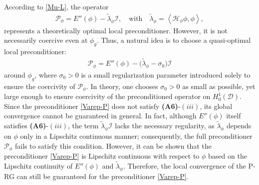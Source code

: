 \documentclass[preprint,3p]{elsarticle}
\begin{document}
According to \eqref{Mu-L}, the operator 
\begin{align*}
	\mathcal{P}_{\phi} = E''(\phi) - \widetilde{\lambda}_{\phi}\mathcal{I},\quad\text{with}\quad \widetilde{\lambda}_{\phi}=\left\langle\mathcal{H}_{\phi}\phi,\phi\right\rangle,
\end{align*}
represents a theoretically optimal local preconditioner. However, it is not necessarily coercive even at $\phi_g$. Thus, a natural idea is to choose a {quasi}-optimal local preconditioner:
\begin{align}\label{Varep-P}
	\mathcal{P}_{\phi}=E''(\phi)-\big(\widetilde{\lambda}_{\phi}-\sigma_0\big)\mathcal{I}
\end{align}
around $\phi_g$, where {$\sigma_0>0$ is a small regularization parameter introduced solely to ensure the coercivity of $\mathcal{P}_{\phi}$. In theory, one chooses $\sigma_0>0$ as small as possible, yet large enough to ensure coercivity of the preconditioned operator on $H_0^1(\mathcal{D})$.} 
Since the preconditioner \eqref{Varep-P} does not satisfy {\bf (A6)}-$(iii)$, its global convergence cannot be guaranteed in general. {In fact, although $E''(\phi)$ itself satisfies {\bf (A6)}-$(iii)$, the term $\widetilde{\lambda}_{\phi} \mathcal{I}$ lacks the necessary regularity, as $\widetilde{\lambda}_{\phi}$ depends on $\phi$ only in a Lipschitz continuous manner; consequently, the full preconditioner $\mathcal{P}_{\phi}$ fails to satisfy this condition.} However, it can be shown that the preconditioner \eqref{Varep-P} is Lipschitz continuous with respect to $\phi$ based on the Lipschitz continuity of $E''(\phi)$ and $\widetilde{\lambda}_{\phi}$. Therefore, the {local} convergence of the P-RG can still be guaranteed for the preconditioner \eqref{Varep-P}. 
\end{document}
